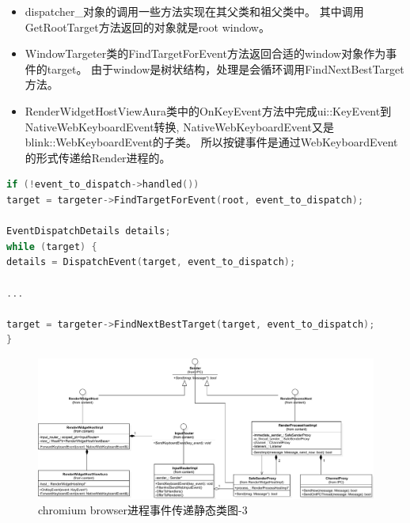 \documentclass[12pt]{article}
\begin{document}
\begin{itemize}
  \item dispatcher\_对象的调用一些方法实现在其父类和祖父类中。
  其中调用GetRootTarget方法返回的对象就是root window。
  \item WindowTargeter类的FindTargetForEvent方法返回合适的window对象作为事件的target。
  由于window是树状结构，处理是会循环调用FindNextBestTarget方法。
  \item RenderWidgetHostViewAura类中的OnKeyEvent方法中完成ui::KeyEvent到NativeWebKeyboardEvent转换,
  NativeWebKeyboardEvent又是blink::WebKeyboardEvent的子类。
  所以按键事件是通过WebKeyboardEvent的形式传递给Render进程的。
\end{itemize}

\begin{spacing}{1.0}
\begin{lstlisting}[language={C++}]
if (!event_to_dispatch->handled())
target = targeter->FindTargetForEvent(root, event_to_dispatch);

EventDispatchDetails details;
while (target) {
details = DispatchEvent(target, event_to_dispatch);

...
  
target = targeter->FindNextBestTarget(target, event_to_dispatch);
}
\end{lstlisting}
\end{spacing}


\begin{figure}[H] 
  \centering 
  \includegraphics[width=\textwidth]{image/browser_event_dispatch_class_3.pdf} 
  \caption{chromium browser进程事件传递静态类图-3} \label{fig:browser_event_dispatch_class_3} 
\end{figure}
\end{document}
